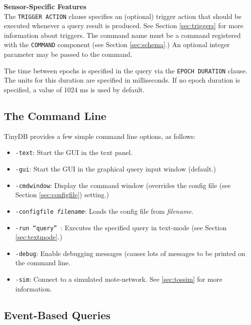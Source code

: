 \documentclass[11pt]{article}
\begin{document}
\noindent
{\bf Sensor-Specific Features}\\

The {\tt TRIGGER ACTION} clause specifies an (optional) trigger
action that should be executed whenever a query
result is produced.  See Section \ref{sec:triggers} for more
information about triggers.  The command name must be a command
registered with the {\tt COMMAND}  component (see
Section \ref{sec:schema}.)  An optional integer parameter may be
passed to the command.

The time between epochs is specified in the query via the
{\tt EPOCH DURATION} clause.  The units for this
duration are specified in milliseconds.  If no epoch duration is
specified, a value of 1024 ms is used by default.

\subsection{The Command Line}\label{sec:commandline}
TinyDB provides a few simple command line 
options, as follows:

\begin{itemize}
\item {\tt -text}: Start the GUI in the text panel.
\item {\tt -gui}: Start the GUI in the graphical query input window (default.)
\item {\tt -cmdwindow}: Display the command window (overrides the
  config file (see Section \ref{sec:configfile}) setting.)
\item {\tt -configfile {\it filename}}: Loads the config file from
  {\it filename}.
\item {\tt -run ``{\it query}'' }: Executes the specified query in
  text-mode (see Section \ref{sec:textmode}.)
\item {\tt -debug}: Enable debugging messages (causes lots of messages
  to be printed on the command line.
\item {\tt -sim}: Connect to a simulated mote-network.  See \ref{sec:tossim} for
  more information.
\end{itemize}

\subsection{Event-Based Queries}
\label{sec:event-queries}
\end{document}
